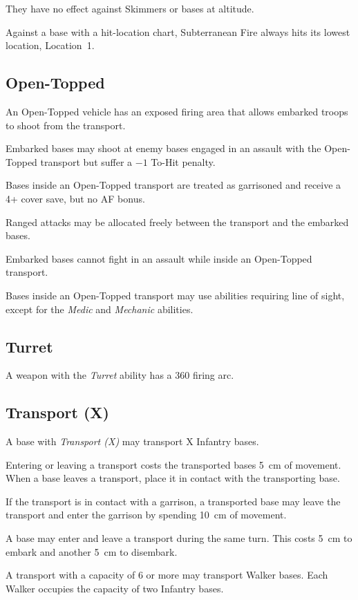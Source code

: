 They have no effect against Skimmers or bases at altitude.

Against a base with a hit-location chart, Subterranean Fire always hits its lowest location, Location~1.

\subsection{Open-Topped}

An Open-Topped vehicle has an exposed firing area that allows embarked troops to shoot from the transport.

Embarked bases may shoot at enemy bases engaged in an assault with the Open-Topped transport but suffer a $-1$ To-Hit penalty.

Bases inside an Open-Topped transport are treated as garrisoned and receive a 4+ cover save, but no AF bonus.

Ranged attacks may be allocated freely between the transport and the embarked bases.

Embarked bases cannot fight in an assault while inside an Open-Topped transport.

Bases inside an Open-Topped transport may use abilities requiring line of sight, except for the \textit{Medic} and \textit{Mechanic} abilities.

\subsection{Turret}

A weapon with the \textit{Turret} ability has a 360\textdegree{} firing arc.

\subsection{Transport (X)}

A base with \textit{Transport (X)} may transport X Infantry bases.

Entering or leaving a transport costs the transported bases 5~cm of movement. When a base leaves a transport, place it in contact with the transporting base.

If the transport is in contact with a garrison, a transported base may leave the transport and enter the garrison by spending 10~cm of movement.

A base may enter and leave a transport during the same turn. This costs 5~cm to embark and another 5~cm to disembark.

A transport with a capacity of 6 or more may transport Walker bases. Each Walker occupies the capacity of two Infantry bases.

